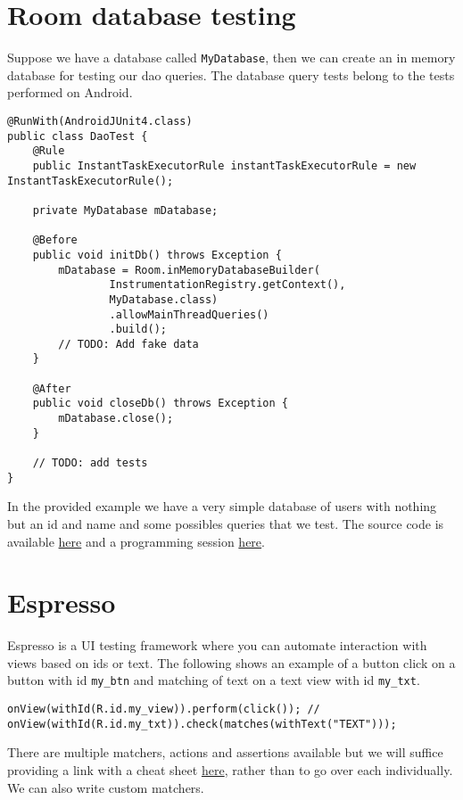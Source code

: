 \section{Room database testing}
Suppose we have a database called \texttt{MyDatabase}, then we can create an in memory database for testing our dao queries. The database query tests belong to the tests performed on Android.
\begin{lstlisting}[style=A_Java]
@RunWith(AndroidJUnit4.class)
public class DaoTest {
    @Rule
    public InstantTaskExecutorRule instantTaskExecutorRule = new InstantTaskExecutorRule();

    private MyDatabase mDatabase;

    @Before
    public void initDb() throws Exception {
        mDatabase = Room.inMemoryDatabaseBuilder(
                InstrumentationRegistry.getContext(),
                MyDatabase.class)
                .allowMainThreadQueries()
                .build();
        // TODO: Add fake data
    }

    @After
    public void closeDb() throws Exception {
        mDatabase.close();
    }

    // TODO: add tests
}
\end{lstlisting}
In the provided example we have a very simple database of users with nothing but an id and name and some possibles queries that we test. The
source code is available \href{https://github.com/JonSteinn/AndroidDevelopment/tree/master/examples/lab6/roomtest}{here} and a programming session \href{https://www.youtube.com/watch?v=aMxfgqUGnhc}{here}.

\section{Espresso}
Espresso is a UI testing framework where you can automate interaction with views based on ids or text. The following shows an example of a button click on a button with id \texttt{my\_btn} and matching of text on a text view with id \texttt{my\_txt}.
\begin{lstlisting}[style=A_Java]
onView(withId(R.id.my_view)).perform(click()); // 
onView(withId(R.id.my_txt)).check(matches(withText("TEXT")));
\end{lstlisting}
There are multiple matchers, actions and assertions available but we will suffice providing a link with a cheat sheet \href{https://google.github.io/android-testing-support-library/downloads/espresso-cheat-sheet-2.1.0.pdf}{here}, rather than to go over each individually. We can also write custom matchers.\\

